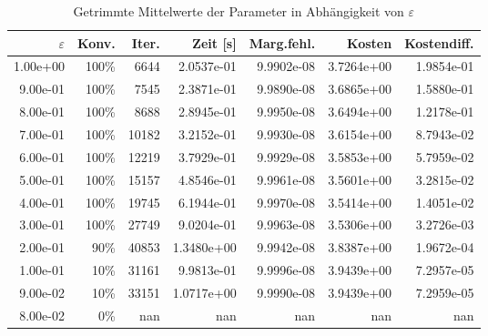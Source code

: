 \begin{table}[htbp]
\caption{Getrimmte Mittelwerte der Parameter in Abhängigkeit von $\varepsilon$}
\label{tab:Parametertest256_tol1e-07}
\small
\centering
{}
\begin{tabular}{rrrrrrr}
\toprule
$\varepsilon$ & Konv. & Iter. & Zeit [s] & Marg.fehl. & Kosten & Kostendiff. \\
\midrule
1.00e+00 & 100\% & 6644 & 2.0537e-01 & 9.9902e-08 & 3.7264e+00 & 1.9854e-01 \\
9.00e-01 & 100\% & 7545 & 2.3871e-01 & 9.9890e-08 & 3.6865e+00 & 1.5880e-01 \\
8.00e-01 & 100\% & 8688 & 2.8945e-01 & 9.9950e-08 & 3.6494e+00 & 1.2178e-01 \\
7.00e-01 & 100\% & 10182 & 3.2152e-01 & 9.9930e-08 & 3.6154e+00 & 8.7943e-02 \\
6.00e-01 & 100\% & 12219 & 3.7929e-01 & 9.9929e-08 & 3.5853e+00 & 5.7959e-02 \\
5.00e-01 & 100\% & 15157 & 4.8546e-01 & 9.9961e-08 & 3.5601e+00 & 3.2815e-02 \\
4.00e-01 & 100\% & 19745 & 6.1944e-01 & 9.9970e-08 & 3.5414e+00 & 1.4051e-02 \\
3.00e-01 & 100\% & 27749 & 9.0204e-01 & 9.9963e-08 & 3.5306e+00 & 3.2726e-03 \\
2.00e-01 & 90\% & 40853 & 1.3480e+00 & 9.9942e-08 & 3.8387e+00 & 1.9672e-04 \\
1.00e-01 & 10\% & 31161 & 9.9813e-01 & 9.9996e-08 & 3.9439e+00 & 7.2957e-05 \\
9.00e-02 & 10\% & 33151 & 1.0717e+00 & 9.9990e-08 & 3.9439e+00 & 7.2959e-05 \\
8.00e-02 & 0\% & nan & nan & nan & nan & nan \\
\bottomrule
\end{tabular}
\end{table}
